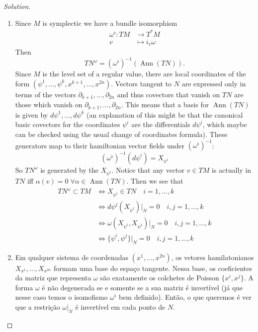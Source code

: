 \begin{proof}[Solution]\leavevmode
	\begin{enumerate}[label=\alph*.]
		\item Since $M$ is symplectic we have a bundle isomorphism
\begin{align*}
	\omega^\flat: TM &\longrightarrow T^*M \\
	v &\longmapsto i_v\omega
\end{align*}
Then 
\[T N^\omega=(\omega^\flat )^{-1}(\operatorname{Ann}(T N)).\]
Since $M$ is the level set of a regular value, there are local coordinates of the form $(\psi^1,\ldots,\psi^k,x^{k+1},\ldots,x^{2n})$. Vectors tangent to $N$ are expressed only in terms of the vectors $\partial_{k+1},\ldots,\partial_{2n}$ and thus covectors that vanish on $T N$ are those which vanish on $\partial_{k+1},\ldots, \partial_{2n}$. This means that a basis for $\operatorname{Ann}(T N)$ is given by $d\psi^1,\ldots,d\psi^k$ (an explanation of this might be that the canonical basic covectors for the coordinates $\psi^i$ are the differentials $d\psi^i$, which maybe can be checked using the usual change of coordinates formula). These generators map to their hamiltonian vector fields under $(\omega^\flat)^{-1}$:
\[\left(\omega^\flat \right)^{-1}(d\psi^i)=X_{\psi^i}\]
So $T N^\omega$ is generated by the $X_{\psi^i}$. Notice that any vector $v \in TM$ is actually in $T N$ iff $\alpha(v)=0\;\forall \alpha\in\operatorname{Ann}(T N) $. Then we see that
\begin{align*}
	T N^\omega\subset TM&\iff X_{\psi^i}\in T N\quad i=1,\ldots,k\\
	&\iff d\psi^j(X_{\psi^i})|_{N}=0 \quad i,j=1,\ldots,k\\
	&\iff \omega(X_{\psi^i},X_{\psi^j})|_{N}=0\quad i,j=1,\ldots,k\\
	&\iff \{\psi^i,\psi^j\}|_{N}=0\quad i,j=1,\ldots,k
\end{align*}

\item Em qualquer sistema de coordenadas $(x^1,\ldots,x^{2n})$, os vetores hamilatonianos $X_{x^1},\ldots,X_{x^{2n}}$ formam uma base do espaço tangente. Nessa base, os coeficientes da matriz que representa $\omega$ s\~ao exatamente os colchetes de Poisson  $\{x^i,x^j\}$. A forma $\omega$ \'e n\~ao degenerada se e somente se a sua matriz \'e invert\'ivel (j\'a que nesse caso temos o isomofismo $\omega^\flat$ bem definido). Então, o que queremos \'e ver que a restri\c c\~ao $\omega|_{N}$ \'e invert\'ivel em cada ponto de $N$.


\end{enumerate}
\end{proof}
